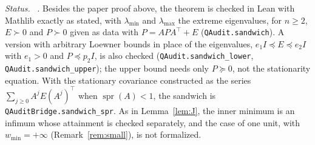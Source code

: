 \emph{Status.} \stA\ \stM. Besides the paper proof above, the theorem is checked in Lean with Mathlib exactly as stated, with $\lambda_{\min}$ and $\lambda_{\max}$ the extreme eigenvalues, for $n\ge2$, $E\succ0$ and $P\succ0$ given as data with $P=APA^\top+E$ (\texttt{QAudit.sandwich}). A version with arbitrary Loewner bounds in place of the eigenvalues, $e_1I\preceq E\preceq e_2I$ with $e_1>0$ and $P\preceq p_2I$, is also checked (\texttt{QAudit.sandwich\_lower}, \texttt{QAudit.sandwich\_upper}); the upper bound needs only $P\succeq0$, not the stationarity equation. With the stationary covariance constructed as the series $\sum_{j\ge0}A^jE(A^j)^\top$ when $\operatorname{spr}(A)<1$, the sandwich is \texttt{QAuditBridge.sandwich\_spr}. As in Lemma~\ref{lem:J}, the inner minimum is an infimum whose attainment is checked separately, and the case of one unit, with $w_{\min}=+\infty$ (Remark~\ref{rem:small}), is not formalized.

